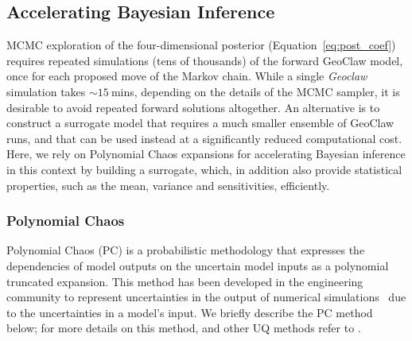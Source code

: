 \subsection{Accelerating Bayesian Inference}
\label{sec:uqpce}


MCMC exploration of the four-dimensional posterior (Equation~\ref{eq:post_coef}) requires repeated simulations (tens of thousands) of the forward GeoClaw model, once for each proposed move of the Markov chain. While a single \emph{Geoclaw} simulation
takes $\sim 15~$mins, depending on the details of the MCMC sampler, it is desirable to avoid repeated forward solutions altogether. An alternative is to construct a surrogate model that requires a much
smaller ensemble of GeoClaw runs, and that can be used instead
at a significantly reduced computational cost.  Here, we rely on
Polynomial Chaos expansions for accelerating Bayesian inference in this context 
by building a surrogate, which, in addition
also provide statistical properties,  such as the mean, variance and sensitivities,
efficiently. 

\subsubsection{Polynomial Chaos}

Polynomial Chaos (PC) is a probabilistic methodology that expresses the 
dependencies of model outputs on the uncertain model inputs
as a polynomial truncated expansion. This method has been developed in 
the engineering community to represent uncertainties in the output of 
numerical simulations~\citep{Villegas2012,Lin2009,Xiu2004}
due to the uncertainties in a model's input. We briefly describe the PC
method below; for more details on this method, and other UQ methods
refer to \citep{LeMaitreKnio2010}.

